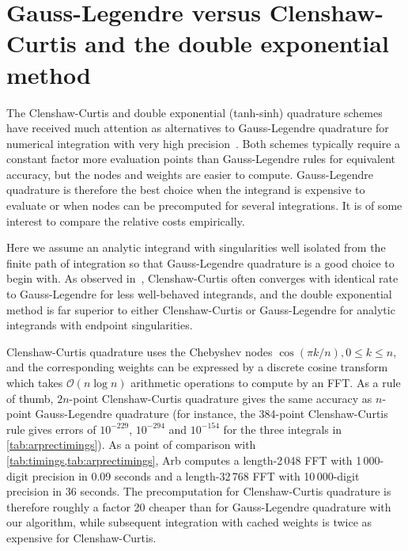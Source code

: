 \documentclass[nohypdvips,review]{siamart0216}
\newcommand{\OO}{\mathcal{O}}
\begin{document}
\section{Gauss-Legendre versus Clenshaw-Curtis and the double exponential method}

\label{sec:vsothers}

The Clenshaw-Curtis and double exponential (tanh-sinh) quadrature schemes
have received much attention as alternatives to Gauss-Legendre
quadrature for numerical integration with very high precision~\cite{takahasi1974double,bailey2011high,trefethen2008gauss}.
Both schemes
typically require a constant factor more evaluation points than Gauss-Legendre rules
for equivalent accuracy, but the nodes and weights are easier to compute.
Gauss-Legendre quadrature is therefore the best choice
when the integrand is expensive to evaluate or when nodes can
be precomputed for several integrations.
It is of some interest to compare the relative costs empirically.

Here we assume an analytic integrand with singularities well isolated from
the finite path of integration so that Gauss-Legendre quadrature is a good
choice to begin with. As observed in~\cite{trefethen2008gauss},
Clenshaw-Curtis often converges with identical rate to Gauss-Legendre for
less well-behaved integrands,
and the double exponential method is far superior to either
Clenshaw-Curtis or Gauss-Legendre for
analytic integrands with endpoint singularities.

Clenshaw-Curtis quadrature uses the Chebyshev nodes
$\cos(\pi k / n), 0 \le k \le n$, and the corresponding weights can be expressed
by a discrete cosine transform which takes $\OO(n \log n)$
arithmetic operations to compute by an FFT.
As a rule of thumb, $2n$-point Clenshaw-Curtis quadrature
gives the same accuracy as $n$-point Gauss-Legendre quadrature
(for instance, the 384-point Clenshaw-Curtis rule gives
errors of $10^{-229}$, $10^{-294}$ and $10^{-154}$ for the three
integrals in \cref{tab:arprectimings}).
As a point of comparison with \cref{tab:timings,tab:arprectimings},
Arb computes a length-2\,048 FFT with 1\,000-digit precision
in 0.09 seconds and a length-32\,768 FFT with 10\,000-digit precision
in 36 seconds.
The precomputation for Clenshaw-Curtis quadrature is therefore
roughly a factor 20 cheaper than for Gauss-Legendre quadrature
with our algorithm, while subsequent integration with
cached weights is twice as expensive for Clenshaw-Curtis.
\end{document}
